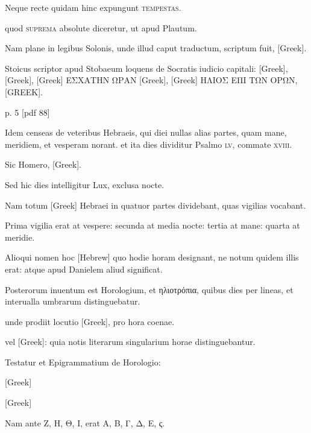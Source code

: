 Neque recte
quidam hinc expungunt \textsc{tempestas}.

quod \textsc{suprema} absolute
diceretur, ut apud Plautum.

Nam plane in legibus Solonis, unde illud
caput traductum, scriptum fuit, \textgreek{[Greek]}.

Stoicus
scriptor apud Stobaeum loquens de Socratis iudicio capitali: 
\textgreek{[Greek], [Greek], [Greek]
ΕΣΧΑΤΗΝ ΩΡΑΝ [Greek], [Greek] ΗΛΙΟΣ ΕΠΙ ΤΩΝ
ΟΡΩΝ, [GREEK]}.



p. 5 [pdf 88]

Idem censeas de veteribus Hebraeis,
qui diei nullas alias partes, quam mane, meridiem, et vesperam norant.
et ita dies dividitur Psalmo \textsc{lv}, commate \textsc{xviii}.

Sic Homero,
\textgreek{[Greek]}.

Sed hic dies intelligitur Lux, exclusa nocte.

Nam totum \textgreek{[Greek]} Hebraei in quatuor partes dividebant, quas vigilias
vocabant.

Prima vigilia erat at vespere: secunda at media nocte:
tertia at mane: quarta at meridie.

Alioqui nomen hoc \texthebrew{[Hebrew]} quo hodie
horam designant, ne notum quidem illis erat: atque apud Danielem
aliud significat.

Posterorum inuentum est Horologium, et \textgreek{ηλιοτρόπια},
quibus dies per lineas, et interualla umbrarum distinguebatur.

unde prodiit locutio \textgreek{[Greek]}, pro hora coenae.

vel \textgreek{[Greek]}:
quia notis literarum singularium horae distinguebantur.

Testatur et Epigrammatium de Horologio:

\textgreek{[Greek]}

\textgreek{[Greek]}

Nam ante
\textgreek{Ζ, Η, Θ, Ι,} erat \textgreek{Α, Β, Γ, Δ, Ε, ς.}

